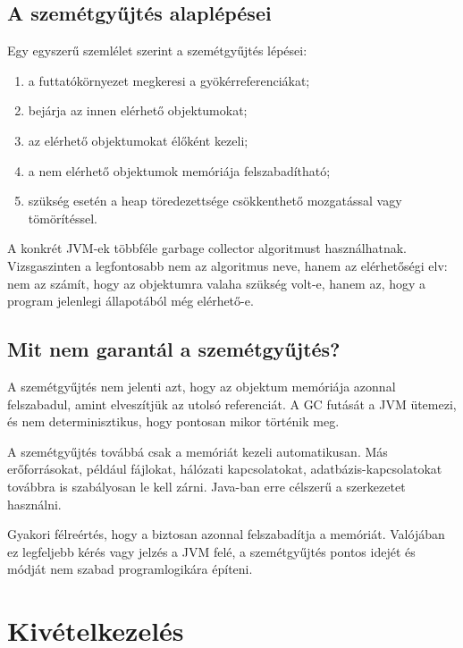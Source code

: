 

\subsection{A szemétgyűjtés alaplépései}

Egy egyszerű szemlélet szerint a szemétgyűjtés lépései:

\begin{enumerate}
  \item a futtatókörnyezet megkeresi a gyökérreferenciákat;
  \item bejárja az innen elérhető objektumokat;
  \item az elérhető objektumokat élőként kezeli;
  \item a nem elérhető objektumok memóriája felszabadítható;
  \item szükség esetén a heap töredezettsége csökkenthető mozgatással vagy tömörítéssel.
\end{enumerate}

A konkrét JVM-ek többféle garbage collector algoritmust használhatnak. Vizsgaszinten a legfontosabb nem az algoritmus neve, hanem az elérhetőségi elv: nem az számít, hogy az objektumra valaha szükség volt-e, hanem az, hogy a program jelenlegi állapotából még elérhető-e.

\subsection{Mit nem garantál a szemétgyűjtés?}

A szemétgyűjtés nem jelenti azt, hogy az objektum memóriája azonnal felszabadul, amint elveszítjük az utolsó referenciát. A GC futását a JVM ütemezi, és nem determinisztikus, hogy pontosan mikor történik meg.

A szemétgyűjtés továbbá csak a memóriát kezeli automatikusan. Más erőforrásokat, például fájlokat, hálózati kapcsolatokat, adatbázis-kapcsolatokat továbbra is szabályosan le kell zárni. Java-ban erre célszerű a  szerkezetet használni.

\begin{warningbox}
Gyakori félreértés, hogy a  biztosan azonnal felszabadítja a memóriát. Valójában ez legfeljebb kérés vagy jelzés a JVM felé, a szemétgyűjtés pontos idejét és módját nem szabad programlogikára építeni.
\end{warningbox}

\section{Kivételkezelés}

